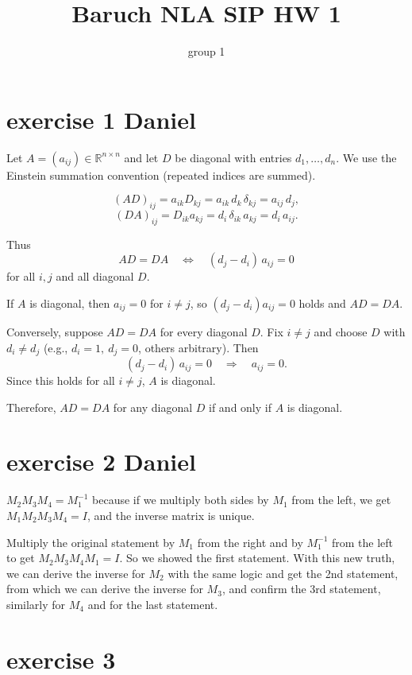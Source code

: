 \documentclass{article}
\title{Baruch NLA SIP HW 1}
\author{group 1}
\begin{document}
\maketitle
\tableofcontents

\section{exercise 1 Daniel}
Let \(A = (a_{ij}) \in \mathbb{R}^{n\times n}\) and let \(D\) be diagonal with entries \(d_1, \dots, d_n\).
We use the Einstein summation convention (repeated indices are summed).

\[
    (AD)_{ij} = a_{ik} D_{kj} = a_{ik} \, d_k \, \delta_{kj} = a_{ij} \, d_j,
\]
\[
    (DA)_{ij} = D_{ik} a_{kj} = d_i \, \delta_{ik} \, a_{kj} = d_i \, a_{ij}.
\]

Thus
\[
    AD = DA \quad \Longleftrightarrow \quad (d_j - d_i)\, a_{ij} = 0
\]
for all \(i,j\) and all diagonal \(D\).

If \(A\) is diagonal, then \(a_{ij} = 0\) for \(i \neq j\), so \((d_j - d_i)a_{ij} = 0\) holds and \(AD = DA\).

Conversely, suppose \(AD = DA\) for every diagonal \(D\).
Fix \(i \neq j\) and choose \(D\) with \(d_i \neq d_j\) (e.g., \(d_i = 1,\ d_j = 0\), others arbitrary).
Then
\[
    (d_j - d_i)\, a_{ij} = 0 \quad \Longrightarrow \quad a_{ij} = 0.
\]
Since this holds for all \(i \neq j\), \(A\) is diagonal.

Therefore, \(AD = DA\) for any diagonal \(D\) if and only if \(A\) is diagonal.

\section{exercise 2 Daniel}
$M_2 M_3 M_4=M_1^{-1}$ because if we multiply both sides by $M_1$ from the left, we get $M_1 M_2 M_3 M_4 = I$, and the inverse matrix is unique.

Multiply the original statement by $M_1$ from the right and by $M_1^{-1}$ from the left to get $M_2 M_3 M_4 M_1 = I$. So we showed the first statement.
With this new truth, we can derive the inverse for $M_2$ with the same logic and get the 2nd statement,
from which we can derive the inverse for $M_3$, and confirm the 3rd statement, similarly for $M_4$ and for the last statement.

\section{exercise 3}
\end{document}
